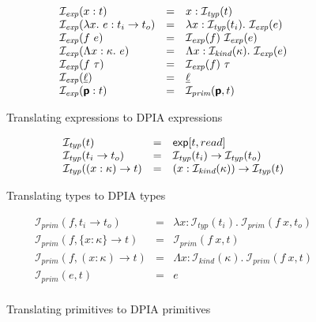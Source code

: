 \newcommand{\expToDPIA}[1]{\mathcal{I}_\textit{exp}(#1)}
\newcommand{\typToDPIA}[1]{\mathcal{I}_\textit{typ}(#1)}
\newcommand{\kindToDPIA}[1]{\mathcal{I}_\textit{kind}(#1)}
\newcommand{\primToDPIA}[2]{\mathcal{I}_\textit{prim}(#1, #2)}

\begin{figure}
  \begin{displaymath}
    \begin{array}{lcl}
      \expToDPIA{x : t} &=& x : \typToDPIA{t} \\
      \expToDPIA{\lambda x.~e : t_i \to t_o} &=& \lambda x : \typToDPIA{t_i}.~ \expToDPIA{e} \\
      \expToDPIA{f~e} &=& \expToDPIA{f}~\expToDPIA{e} \\
      \expToDPIA{\Lambda x : \kappa.~e} &=& \Lambda x : \kindToDPIA{\kappa}.~\expToDPIA{e} \\
      \expToDPIA{f~\tau} &=& \expToDPIA{f}~\tau \\
      \expToDPIA{\underline{\ell}} &=& \underline{\ell} \\
      \expToDPIA{\prim{p} : t} &=& \primToDPIA{\prim{p}}{t} \\
    \end{array}
  \end{displaymath}
  \caption{Translating \Lift{} expressions to DPIA expressions}
\end{figure}

\begin{figure}
  \begin{displaymath}
    \begin{array}{lcl}
      \typToDPIA{t} &=& \tyexp{t}{read} \\ %
      \typToDPIA{t_i \to t_o} &=& \typToDPIA{t_i} \to \typToDPIA{t_o} \\
      \typToDPIA{(x : \kappa) \to t} &=& (x : \kindToDPIA{\kappa}) \to \typToDPIA{t} \\
    \end{array}
  \end{displaymath}
  \caption{Translating \Lift{} types to DPIA types}
\end{figure}

\begin{figure}
  \begin{displaymath}
    \begin{array}{lcl}
      \primToDPIA{f}{t_i \to t_o} &=& \lambda x : \typToDPIA{t_i}.~\primToDPIA{f~x}{t_o} \\
      \primToDPIA{f}{\{ x: \kappa \} \to t} &=& \primToDPIA{f~x}{t} \\
      \primToDPIA{f}{( x: \kappa ) \to t} &=& \Lambda x : \kindToDPIA{\kappa}.~\primToDPIA{f~x}{t} \\
      \primToDPIA{e}{t} &=& e \\
    \end{array}
  \end{displaymath}
  \caption{Translating \Lift{} primitives to DPIA primitives}
\end{figure}